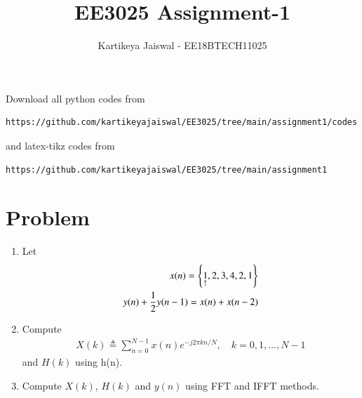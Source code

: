 \documentclass[journal,12pt,twocolumn]{IEEEtran}
\renewcommand\thesection{\arabic{section}}
\begin{document}
     \def\rightbox#1{\makebox[0in][r]{#1}}
     \def\centbox#1{\makebox[0in]{#1}}
     \def\topbox#1{\raisebox{-\baselineskip}[0in][0in]{#1}}
     \def\midbox#1{\raisebox{-0.5\baselineskip}[0in][0in]{#1}}
\vspace{3cm}
\title{EE3025 Assignment-1}
\author{Kartikeya Jaiswal - EE18BTECH11025}
\maketitle
\newpage
\bigskip
\renewcommand{\thefigure}{\theenumi}
\renewcommand{\thetable}{\theenumi}
Download all python codes from 
\begin{lstlisting}
https://github.com/kartikeyajaiswal/EE3025/tree/main/assignment1/codes
\end{lstlisting}
%
and latex-tikz codes from 
%
\begin{lstlisting}
https://github.com/kartikeyajaiswal/EE3025/tree/main/assignment1
\end{lstlisting}
\section{Problem}
\begin{enumerate}[label=\thesection.\arabic*.,ref=\thesection.\theenumi]
    
    \item Let
    \begin{align}
        x(n) = \left\{\underset{\uparrow}{1},2,3,4,2,1\right\}
         \label{eq:equation0}\\
        y(n) + \frac{1}{2}y(n-1) = x(n) + x(n-2)	
        \label{eq:equation1}
    \end{align}
    
    \item Compute 
    \begin{align}
        X(k) \triangleq \sum_{n=0}^{N-1} x(n) e^{-j 2 \pi k n / N}, \quad k=0,1, \ldots, N-1
    \end{align}
    and $H(k)$ using h(n).
    
    \item Compute $X(k)$, $H(k)$ and $y(n)$ using FFT and IFFT methods.
\end{enumerate}
\end{document}
